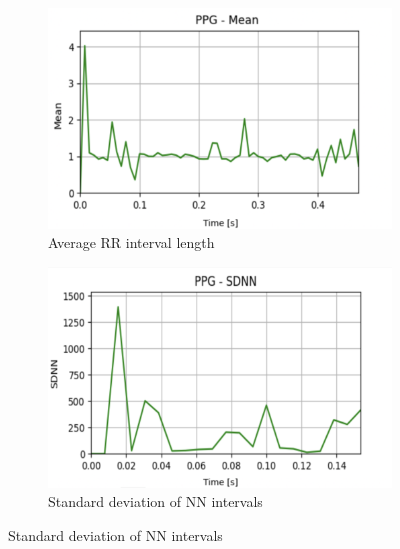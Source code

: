 \documentclass{citask}
\begin{document}
\begin{figure}[h]
    \centering
    \begin{subfigure}{0.47\textwidth}
        \centering
        \includegraphics[width=\linewidth]{images/Mean.png}
        \caption{Average RR interval length}
    \end{subfigure}
    
   \vspace{0.2cm} 
    \begin{subfigure}{0.47\textwidth}
        \centering
        \includegraphics[width=\linewidth]{images/SDNN.png}
        \caption{Standard deviation of NN intervals}
    \end{subfigure}
    

\end{figure}
\end{document}
